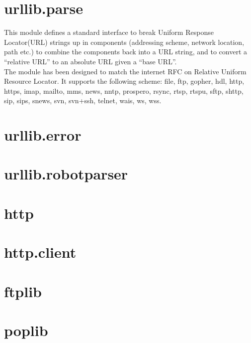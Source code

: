 \section{urllib.parse}
This module defines a standard interface to break Uniform Response Locator(URL) strings up in
components (addressing scheme, network location, path etc.) to combine the components back into
a URL string, and to convert a \textquotedblleft{relative URL}\textquotedblright{} to an absolute
URL given a \textquotedblleft{base URL}\textquotedblright{}.\\

The module has been designed to match the internet RFC on Relative Uniform Resource Locator. It
supports the following scheme: file, ftp, gopher, hdl, http, https, imap, mailto, mms, news, nntp,
prospero, rsync, rtsp, rtspu, sftp, shttp, sip, sips, snews, svn, svn+ssh, telnet, wais, ws, wss.





\section{urllib.error}





\section{urllib.robotparser}





\section{http}





\section{http.client}






\section{ftplib}






\section{poplib}








